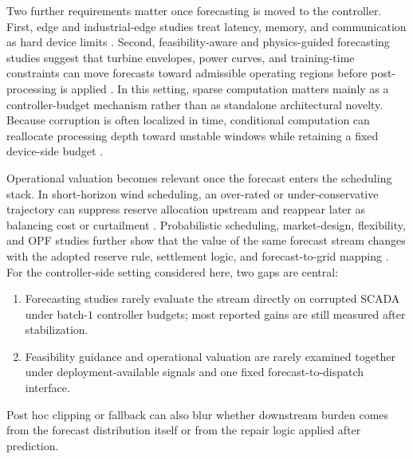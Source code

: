 \documentclass[review,1p,times]{elsarticle}
\begin{document}
Two further requirements matter once forecasting is moved to the controller. First, edge and industrial-edge studies treat latency, memory, and communication as hard device limits \citep{zhou2019edge,gooi2023edgeintelligence,mwangi2024sdniiotedge}. Second, feasibility-aware and physics-guided forecasting studies suggest that turbine envelopes, power curves, and training-time constraints can move forecasts toward admissible operating regions before post-processing is applied \citep{astolfi2015datamining,martincalzada2025optimized,liu2024physics,liao2024trust}. In this setting, sparse computation matters mainly as a controller-budget mechanism rather than as standalone architectural novelty. Because corruption is often localized in time, conditional computation can reallocate processing depth toward unstable windows while retaining a fixed device-side budget \citep{jacobs1991moe,fedus2022switch}.

Operational valuation becomes relevant once the forecast enters the scheduling stack. In short-horizon wind scheduling, an over-rated or under-conservative trajectory can suppress reserve allocation upstream and reappear later as balancing cost or curtailment \citep{davis2024impact,yan2025economicvalue}. Probabilistic scheduling, market-design, flexibility, and OPF studies further show that the value of the same forecast stream changes with the adopted reserve rule, settlement logic, and forecast-to-grid mapping \citep{wang2011wind,quan2015computational,houben2023optimal,guo2023marketdesign,srinivasan2023flexibility,lechl2025flexcalc,terren2025extreme,huo2025pricesignal,khaloie2020coordinated,li2024opf_highren,liu2024vscopf,larrahondo2021acdcomp}. For the controller-side setting considered here, two gaps are central:
\begin{enumerate}
\item Forecasting studies rarely evaluate the stream directly on corrupted SCADA under batch-$1$ controller budgets; most reported gains are still measured after stabilization.
\item Feasibility guidance and operational valuation are rarely examined together under deployment-available signals and one fixed forecast-to-dispatch interface.
\end{enumerate}
Post hoc clipping or fallback can also blur whether downstream burden comes from the forecast distribution itself or from the repair logic applied after prediction.
\end{document}
